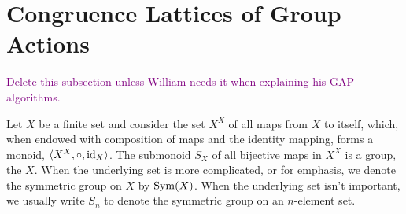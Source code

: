 \section{Congruence Lattices of Group Actions}
\label{sec:congr-latt-group}

\textcolor{purple}{Delete this subsection unless William needs it when explaining
his GAP algorithms.}

Let $X$ be a finite set and consider the set $X^X$ of all maps from $X$ to
itself, which, when endowed with composition of maps and the identity mapping,
forms a monoid, $\langle X^X, \circ, \operatorname{id}_X\rangle$.  The submonoid $S_X$ of all bijective
maps in $X^X$ is a group, the  $X$.  When the
underlying set is more complicated, or for emphasis, we denote the symmetric
group on $X$ by $\operatorname{Sym}(X)$.  When the  
underlying set isn't important, we usually write $S_n$ to denote the
symmetric group on an $n$-element set. 




